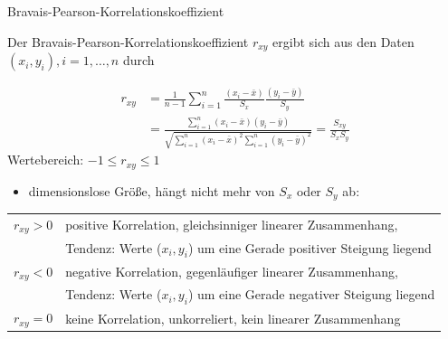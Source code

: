 \documentclass[
  10pt,
  ignorenonframetext,
]{beamer}
\providecommand{\tightlist}{%
  \setlength{\itemsep}{0pt}\setlength{\parskip}{0pt}}
\begin{document}
\begin{frame}{Bravais-Pearson-Korrelationskoeffizient}
\protect\hypertarget{bravais-pearson-korrelationskoeffizient}{}
\small

Der Bravais-Pearson-Korrelationskoeffizient \(r_{xy}\) ergibt sich aus
den Daten \((x_i,y_i), i=1,\ldots,n\) durch

\vspace{0.3cm}

\begin{align*}
      r_{xy} &= \frac{1}{n-1} \sum_{i=1}^n \frac{(x_i - \bar x)}{S_x}\frac{(y_i - \bar y)}{S_y} \\
             &= \frac{\sum_{i=1}^n(x_i - \bar x)(y_i - \bar y)}
      {\sqrt{\sum_{i=1}^n(x_i - \bar x)^2 \sum_{i=1}^n(y_i - \bar y)^2}} = \frac{S_{xy}}{S_x S_y}
  \end{align*} Wertebereich: \(-1 \leq r_{xy} \leq 1\)

\begin{itemize}
\tightlist
\item
  dimensionslose Größe, hängt nicht mehr von \(S_x\) oder \(S_y\) ab:
\end{itemize}

\vspace{0.3cm}

\begin{tabular}{ll}
  $r_{xy}>0$ & positive Korrelation, gleichsinniger linearer Zusammenhang, \\
  &Tendenz: Werte ($x_i,y_i$) um eine Gerade positiver Steigung liegend\\
  $r_{xy}<0$ & negative Korrelation, gegenläufiger linearer Zusammenhang, \\
  &Tendenz: Werte ($x_i,y_i$) um eine Gerade negativer Steigung liegend\\
  $r_{xy}=0$ & keine Korrelation, unkorreliert, kein linearer Zusammenhang
\end{tabular}
\end{frame}
\end{document}
